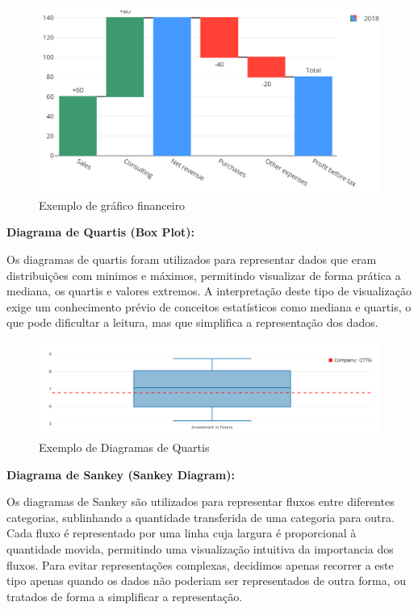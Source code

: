 \begin{figure}[H]
    \centering
    \includegraphics[max width=12cm, keepaspectratio]{./img/waterfall}
    \caption{Exemplo de gráfico financeiro}
\end{figure}
\noindent

\textbf{Diagrama de Quartis (Box Plot):}

Os diagramas de quartis foram utilizados para representar dados que eram distribuições com minimos e máximos, permitindo visualizar de forma prática a mediana, os quartis e valores extremos.  A interpretação deste tipo de visualização exige um conhecimento prévio de conceitos estatísticos como mediana e quartis, o que pode dificultar a leitura, mas que simplifica a representação dos dados.

\begin{figure}[H]
    \centering
    \includegraphics[max width=12cm, keepaspectratio]{./img/box}
    \caption{Exemplo de Diagramas de Quartis}
\end{figure}
\noindent

\textbf{Diagrama de Sankey (Sankey Diagram):}

Os diagramas de Sankey são utilizados para representar fluxos entre diferentes categorias, sublinhando a quantidade transferida de uma categoria para outra. Cada fluxo é representado por uma linha cuja largura é proporcional à quantidade movida, permitindo uma visualização intuitiva da importancia dos fluxos. Para evitar representações complexas, decidimos apenas recorrer a este tipo apenas quando os dados não poderiam ser representados de outra forma, ou tratados de forma a simplificar a representação.

